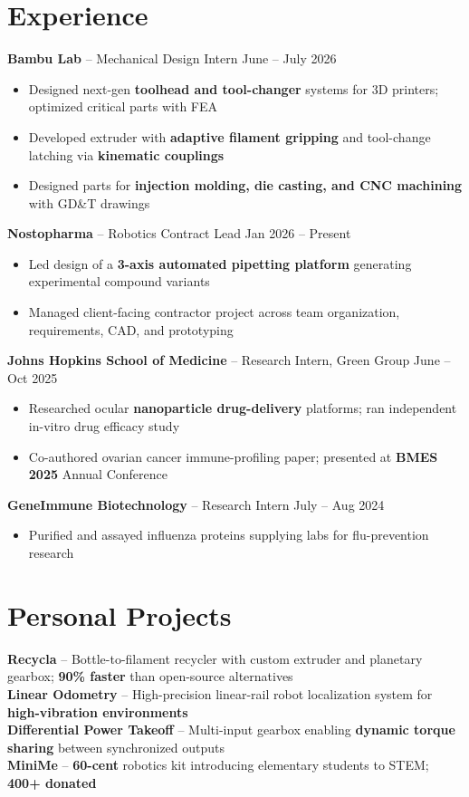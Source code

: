 \documentclass[10pt, letterpaper]{article}
\begin{document}
\section{Experience}
    \textbf{Bambu Lab} -- Mechanical Design Intern
    \hfill June -- July 2026
    \begin{itemize}
        \item Designed next-gen \textbf{toolhead and tool-changer} systems for 3D printers; optimized critical parts with FEA
        \item Developed extruder with \textbf{adaptive filament gripping} and tool-change latching via \textbf{kinematic couplings}
        \item Designed parts for \textbf{injection molding, die casting, and CNC machining} with GD\&T drawings
    \end{itemize}
    \textbf{Nostopharma} -- Robotics Contract Lead
    \hfill Jan 2026 -- Present
    \begin{itemize}
        \item Led design of a \textbf{3-axis automated pipetting platform} generating experimental compound variants
        \item Managed client-facing contractor project across team organization, requirements, CAD, and prototyping
    \end{itemize}
    \textbf{Johns Hopkins School of Medicine} -- Research Intern, Green Group
    \hfill June -- Oct 2025
    \begin{itemize}
        \item Researched ocular \textbf{nanoparticle drug-delivery} platforms; ran independent in-vitro drug efficacy study
        \item Co-authored ovarian cancer immune-profiling paper; presented at \textbf{BMES 2025} Annual Conference
    \end{itemize}
    \textbf{GeneImmune Biotechnology} -- Research Intern
    \hfill July -- Aug 2024
    \begin{itemize}
        \item Purified and assayed influenza proteins supplying labs for flu-prevention research
    \end{itemize}

\section{Personal Projects}
    \textbf{Recycla} -- Bottle-to-filament recycler with custom extruder and planetary gearbox; \textbf{90\% faster} than open-source alternatives\\
    \textbf{Linear Odometry} -- High-precision linear-rail robot localization system for \textbf{high-vibration environments} \\
    \textbf{Differential Power Takeoff} -- Multi-input gearbox enabling \textbf{dynamic torque sharing} between synchronized outputs \\
    \textbf{MiniMe} -- \textbf{60-cent} robotics kit introducing elementary students to STEM; \textbf{400+ donated}
\end{document}
